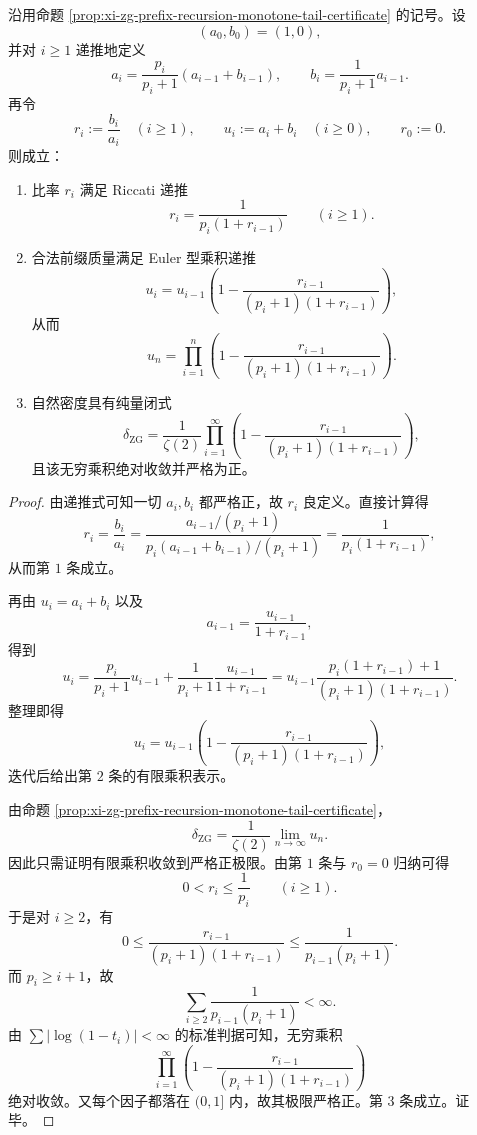 \begin{theorem}\label{thm:xi-time-part62dcb-zg-density-riccati-euler}
沿用命题 \ref{prop:xi-zg-prefix-recursion-monotone-tail-certificate} 的记号。设
\[
(a_0,b_0)=(1,0),
\]
并对 \(i\ge 1\) 递推地定义
\[
a_i=\frac{p_i}{p_i+1}(a_{i-1}+b_{i-1}),
\qquad
b_i=\frac{1}{p_i+1}a_{i-1}.
\]
再令
\[
r_i:=\frac{b_i}{a_i}\quad (i\ge 1),
\qquad
u_i:=a_i+b_i\quad (i\ge 0),
\qquad
r_0:=0.
\]
则成立：
\begin{enumerate}
  \item 比率 \(r_i\) 满足 Riccati 递推
  \[
  r_i=\frac{1}{p_i(1+r_{i-1})}
  \qquad (i\ge 1).
  \]
  \item 合法前缀质量满足 Euler 型乘积递推
  \[
  u_i
  =
  u_{i-1}
  \left(
  1-\frac{r_{i-1}}{(p_i+1)(1+r_{i-1})}
  \right),
  \]
  从而
  \[
  u_n
  =
  \prod_{i=1}^{n}
  \left(
  1-\frac{r_{i-1}}{(p_i+1)(1+r_{i-1})}
  \right).
  \]
  \item 自然密度具有纯量闭式
  \[
  \delta_{\mathrm{ZG}}
  =
  \frac{1}{\zeta(2)}
  \prod_{i=1}^{\infty}
  \left(
  1-\frac{r_{i-1}}{(p_i+1)(1+r_{i-1})}
  \right),
  \]
  且该无穷乘积绝对收敛并严格为正。
\end{enumerate}
\end{theorem}
\begin{proof}
由递推式可知一切 \(a_i,b_i\) 都严格正，故 \(r_i\) 良定义。直接计算得
\[
r_i
=
\frac{b_i}{a_i}
=
\frac{a_{i-1}/(p_i+1)}{p_i(a_{i-1}+b_{i-1})/(p_i+1)}
=
\frac{1}{p_i(1+r_{i-1})},
\]
从而第 \(1\) 条成立。

再由 \(u_i=a_i+b_i\) 以及
\[
a_{i-1}=\frac{u_{i-1}}{1+r_{i-1}},
\]
得到
\[
u_i
=
\frac{p_i}{p_i+1}u_{i-1}
+\frac{1}{p_i+1}\frac{u_{i-1}}{1+r_{i-1}}
=
u_{i-1}
\frac{p_i(1+r_{i-1})+1}{(p_i+1)(1+r_{i-1})}.
\]
整理即得
\[
u_i
=
u_{i-1}
\left(
1-\frac{r_{i-1}}{(p_i+1)(1+r_{i-1})}
\right),
\]
迭代后给出第 \(2\) 条的有限乘积表示。

由命题 \ref{prop:xi-zg-prefix-recursion-monotone-tail-certificate}，
\[
\delta_{\mathrm{ZG}}
=
\frac{1}{\zeta(2)}\lim_{n\to\infty}u_n.
\]
因此只需证明有限乘积收敛到严格正极限。由第 \(1\) 条与 \(r_0=0\) 归纳可得
\[
0<r_i\le \frac{1}{p_i}
\qquad (i\ge 1).
\]
于是对 \(i\ge 2\)，有
\[
0\le
\frac{r_{i-1}}{(p_i+1)(1+r_{i-1})}
\le
\frac{1}{p_{i-1}(p_i+1)}.
\]
而 \(p_i\ge i+1\)，故
\[
\sum_{i\ge 2}\frac{1}{p_{i-1}(p_i+1)}<\infty.
\]
由 \(\sum |\log(1-t_i)|<\infty\) 的标准判据可知，无穷乘积
\[
\prod_{i=1}^{\infty}
\left(
1-\frac{r_{i-1}}{(p_i+1)(1+r_{i-1})}
\right)
\]
绝对收敛。又每个因子都落在 \((0,1]\) 内，故其极限严格正。第 \(3\) 条成立。证毕。
\end{proof}

